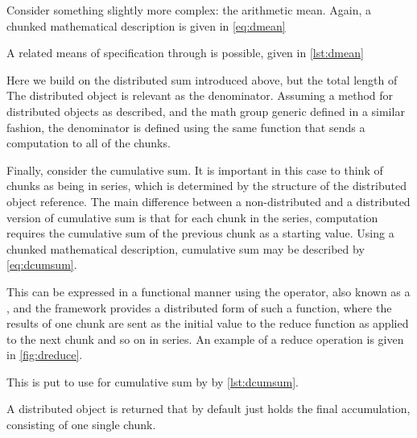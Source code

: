 Consider something slightly more complex: the arithmetic mean.
Again, a chunked mathematical description is given in \cref{eq:dmean}


A related means of specification through \lso{} is possible, given in \cref{lst:dmean}


Here we build on the distributed sum introduced above, but the total length of The distributed object is relevant as the denominator.
Assuming a  method for distributed objects as described, and the math group generic defined in a similar fashion, the denominator is defined using the same  function that sends a  computation to all of the chunks.

Finally, consider the cumulative sum.
It is important in this case to think of chunks as being in series, which is determined by the structure of the distributed object reference.
The main difference between a non-distributed and a distributed version of cumulative sum is that for each chunk in the series, computation requires the cumulative sum of the previous chunk as a starting value.
Using a chunked mathematical description, cumulative sum may be described by \cref{eq:dcumsum}.


This can be expressed in a functional manner using the  operator, also known as a , and the \lso{} framework provides a distributed form of such a function, where the results of one chunk are sent as the initial value to the reduce function as applied to the next chunk and so on in series.
An example of a reduce operation is given in \cref{fig:dreduce}.


This is put to use for cumulative sum by \lso{} by \cref{lst:dcumsum}.


A distributed object is returned that by default just holds the final accumulation, consisting of one single chunk.
